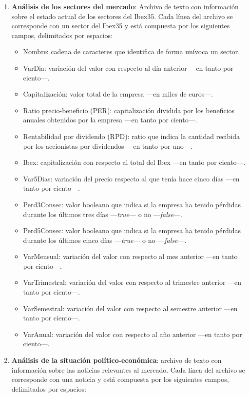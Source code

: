 \documentclass[a4paper, 11pt, titlepage]{article}
\theoremstyle{definition}
\begin{document}
\begin{enumerate}
        \item \textbf{Análisis de los sectores del mercado}: Archivo de texto con información sobre el estado actual de los sectores del Ibex35. Cada línea del archivo se corresponde con un sector del Ibex35 y está compuesta por los siguientes campos, delimitados por espacios:
        \begin{itemize}
            \item Nombre: cadena de caracteres que identifica de forma unívoca un sector.
            \item VarDia: variación del valor con respecto al día anterior ---en tanto por ciento---.
            \item Capitalización: valor total de la empresa ---en miles de euros---.
            \item Ratio precio-beneficio (PER): capitalización dividida por los beneficios anuales obtenidos por la empresa ---en tanto por ciento---.
            \item Rentabilidad por dividendo (RPD): ratio que indica la cantidad recibida por los accionistas por dividendos ---en tanto por uno---.
            \item Ibex: capitalización con respecto al total del Ibex ---en tanto por ciento---.
            \item Var5Dias: variación del precio respecto al que tenía hace cinco días ---en tanto por ciento---.
            \item Perd3Consec: valor booleano que indica si la empresa ha tenido pérdidas durante los últimos tres días ---\emph{true}--- o no ---\emph{false}---.
            \item Perd5Consec: valor booleano que indica si la empresa ha tenido pérdidas durante los últimos cinco días ---\emph{true}--- o no ---\emph{false}---.
            \item VarMensual: variación del valor con respecto al mes anterior ---en tanto por ciento---.
            \item VarTrimestral: variación del valor con respecto al trimestre anterior ---en tanto por ciento---.
            \item VarSemestral: variación del valor con respecto al semestre anterior ---en tanto por ciento---.
            \item VarAnual: variación del valor con respecto al año anterior ---en tanto por ciento---.
        \end{itemize}
        \item \textbf{Análisis de la situación político-económica}: archivo de texto con información sobre las noticias relevantes al mercado. Cada línea del archivo se corresponde con una noticia y está compuesta por los siguientes campos, delimitados por espacios:

\end{enumerate}
\end{document}
